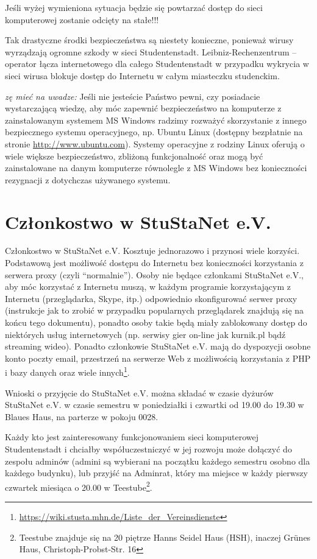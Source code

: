\documentclass[a4paper,12pt]{scrartcl}
\begin{document}
\begin{em}
Jeśli wyżej wymieniona sytuacja będzie się powtarzać dostęp do sieci komputerowej zostanie odcięty na stałe!!!
\end{em}

Tak drastyczne środki bezpieczeństwa są niestety konieczne, ponieważ wirusy wyrządzają ogromne szkody w sieci Studentenstadt. Leibniz-Rechenzentrum – operator łącza internetowego dla całego Studentenstadt w przypadku wykrycia w sieci wirusa blokuje dostęp do Internetu w całym miasteczku studenckim. 

\emph{zę mieć na uwadze:} Jeśli nie jesteście Państwo pewni, czy posiadacie wystarczającą wiedzę, aby móc zapewnić bezpieczeństwo na komputerze z zainstalowanym systemem MS Windows radzimy rozważyć skorzystanie z innego bezpiecznego systemu operacyjnego, np. Ubuntu Linux (dostępny bezpłatnie na stronie \url{http://www.ubuntu.com}). Systemy operacyjne z rodziny Linux oferują o wiele większe bezpieczeństwo, zbliżoną funkcjonalność oraz mogą być zainstalowane na danym komputerze równolegle z MS Windows bez konieczności rezygnacji z dotychczas używanego systemu.

\section*{Członkostwo w StuStaNet e.V.}

Członkostwo w StuStaNet e.V. Kosztuje jednorazowo  i przynosi wiele korzyści. Podstawową jest możliwość dostępu do Internetu bez konieczności korzystania z serwera proxy (czyli "`normalnie"').  Osoby nie będące członkami StuStaNet e.V., aby móc korzystać z Internetu muszą, w każdym programie korzystającym z Internetu (przeglądarka, Skype, itp.) odpowiednio skonfigurować serwer proxy (instrukcje jak to zrobić w przypadku popularnych przeglądarek znajdują się na końcu tego dokumentu), ponadto osoby takie będą miały zablokowany dostęp do niektórych usług internetowych (np. serwisy gier on-line jak kurnik.pl bądź streaming wideo). Ponadto członkowie StuStaNet e.V. mają do dyspozycji osobne konto poczty email, przestrzeń na serwerze Web z możliwością korzystania z PHP i bazy danych oraz wiele innych\footnote{\url{https://wiki.stusta.mhn.de/Liste\_der\_Vereinsdienste}}.

Wnioski o przyjęcie do StuStaNet e.V. można składać w czasie dyżurów StuStaNet e.V. w czasie semestru w poniedziałki i czwartki od 19.00 do 19.30 w Blaues Haus, na parterze w pokoju 0028.

Każdy kto jest zainteresowany funkcjonowaniem sieci komputerowej Studentenstadt i chciałby współuczestniczyć w jej rozwoju może dołączyć do zespołu adminów (admini są wybierani na początku każdego semestru osobno dla każdego budynku), lub przyjść na Adminrat, który ma miejsce w każdy pierwszy czwartek miesiąca o 20.00 w Teestube\footnote{Teestube znajduje się na 20 piętrze Hanns Seidel Haus (HSH), inaczej Grünes Haus, Christoph-Probst-Str. 16}.
\end{document}
